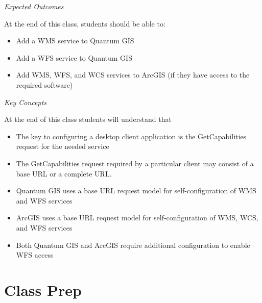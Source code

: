 \documentclass[]{book}
\providecommand{\tightlist}{%
  \setlength{\itemsep}{0pt}\setlength{\parskip}{0pt}}
\begin{document}
\emph{Expected Outcomes}

At the end of this class, students should be able to:

\begin{itemize}
\tightlist
\item
  Add a WMS service to Quantum GIS
\item
  Add a WFS service to Quantum GIS
\item
  Add WMS, WFS, and WCS services to ArcGIS (if they have access to the
  required software)
\end{itemize}

\emph{Key Concepts}

At the end of this class students will understand that

\begin{itemize}
\tightlist
\item
  The key to configuring a desktop client application is the
  GetCapabilities request for the needed service
\item
  The GetCapabilities request required by a particular client may
  consist of a base URL or a complete URL.
\item
  Quantum GIS uses a base URL request model for self-configuration of
  WMS and WFS services
\item
  ArcGIS uses a base URL request model for self-configuration of WMS,
  WCS, and WFS services
\item
  Both Quantum GIS and ArcGIS require additional configuration to enable
  WFS access
\end{itemize}

\section{Class Prep}\label{week12-prep}
\end{document}
